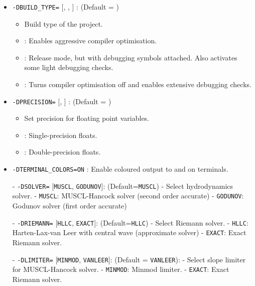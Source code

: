 \begin{itemize}
\item \verb|-DBUILD_TYPE=| [, , ] :
    (Default = )
    \begin{itemize}
        \item Build type of the project.
        \item {}: Enables aggressive compiler optimisation.
        \item {}: Release mode, but with debugging symbols
                attached. Also activates some light debugging checks.
        \item {}: Turns compiler optimisation off and enables
                extensive debugging checks.
    \end{itemize}

\item \verb|-DPRECISION=| [, ] :
    (Default = )
    \begin{itemize}
        \item Set precision for floating point variables.
        \item {}: Single-precision floats.
        \item {}: Double-precision floats.
    \end{itemize}

\item \verb|-DTERMINAL_COLORS=ON| :
    Enable coloured output to  and  on terminals.


- \verb|-DSOLVER=| [\verb|MUSCL|, \verb|GODUNOV|]: (Default=\verb|MUSCL|)
  - Select hydrodynamics solver.
  - \verb|MUSCL|: MUSCL-Hancock solver (second order accurate)
  - \verb|GODUNOV|: Godunov solver (first order accurate)

- \verb|-DRIEMANN=| [\verb|HLLC|, \verb|EXACT|]: (Default=\verb|HLLC|)
  - Select Riemann solver.
  - \verb|HLLC|: Harten-Lax-van Leer with central wave (approximate solver)
  - \verb|EXACT|: Exact Riemann solver.

- \verb|-DLIMITER=| [\verb|MINMOD|, \verb|VANLEER|]: (Default = \verb|VANLEER|):
  - Select slope limiter for MUSCL-Hancock solver.
  - \verb|MINMOD|: Minmod limiter.
  - \verb|EXACT|: Exact Riemann solver.



\end{itemize}








